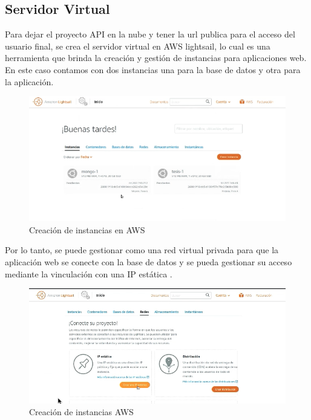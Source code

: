 \documentclass[12pt]{article}
\begin{document}
\subsection{Servidor Virtual}

Para dejar el proyecto API en la nube y tener la url publica para el acceso del usuario final, se crea el servidor virtual en AWS lightsail, lo cual es una herramienta que brinda la creación y gestión de instancias para aplicaciones web. En este caso contamos con dos instancias una para la base de datos y otra para la aplicación.

\begin{figure}[ht]
\centering
\includegraphics[scale=0.4]{imag/maquinasAWS.png}
\caption{Creación de instancias en AWS }
\label{6}
\end{figure}
\FloatBarrier


Por lo tanto, se puede gestionar como una red virtual privada para que la aplicación web se conecte con la base de datos y se pueda gestionar su acceso mediante la vinculación con una IP estática .

\begin{figure}[ht]
\centering
\includegraphics[scale=0.4]{imag/IPestaticaAWS.png}
\caption{Creación de instancias AWS }
\label{6}
\end{figure}
\FloatBarrier
\end{document}
